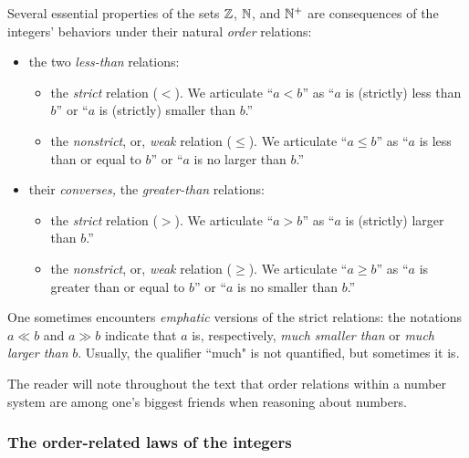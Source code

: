 Several essential properties of the sets $\mathbb{Z}$, $\mathbb{N}$, and $\mathbb{N}^+$ are consequences of the integers' behaviors under their natural {\em order} relations:
\begin{itemize}
\item
the two {\em less-than} relations:
  \begin{itemize}
  \item
the {\em strict} relation ($<$).  We articulate ``$a < b$'' as ``$a$ is (strictly) less than $b$'' or ``$a$ is (strictly) smaller than $b$.''
  \item
the {\em nonstrict}, or, {\em weak} relation ($\leq$).  We articulate ``$a \leq b$'' as ``$a$ is less than or equal to $b$'' or ``$a$ is no larger than $b$.''
  \end{itemize}
 

\item
their {\em converses,} the {\em greater-than} relations:
  \begin{itemize}
  \item
the {\em strict} relation ($>$).  We articulate ``$a > b$'' as ``$a$ is (strictly) larger than $b$.''
  \item
the {\em nonstrict}, or, {\em weak} relation ($\geq$).  We articulate ``$a \geq b$'' as ``$a$ is greater than or equal to $b$'' or ``$a$ is no smaller than $b$.''
  \end{itemize}
\end{itemize}
One sometimes encounters {\em emphatic} versions of the strict relations: the notations $a \ll b$ and $a \gg b$ indicate that $a$ is, respectively, {\em much smaller than} or {\em much larger than} $b$.  Usually, the qualifier ``much" is not quantified, but sometimes it is.

\smallskip

The reader will note throughout the text that order relations within a number system are among one's biggest friends when reasoning about numbers.  

\subsubsection{The order-related laws of the integers}
\label{sec:order-laws}

